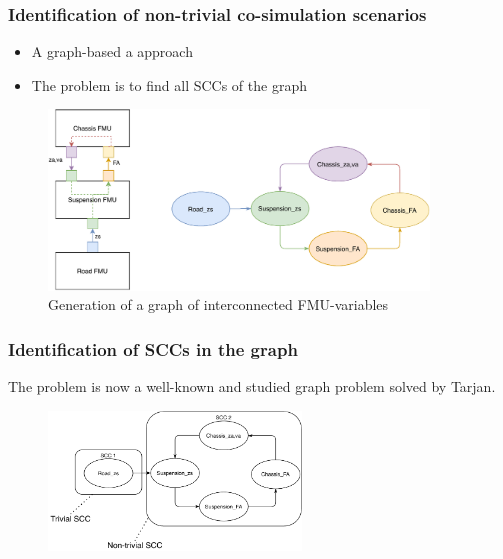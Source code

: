 \documentclass{beamer}
\begin{document}
\begin{frame}
\frametitle{Identification of non-trivial co-simulation scenarios}
\begin{itemize}
    \item A graph-based a approach 
    \item The problem is to find all SCCs of the graph
\end{itemize}
\begin{figure}
    \centering
    \includegraphics[width=0.9\textwidth]{images/quarter_car-graph.pdf}
    \caption{Generation of a graph of interconnected FMU-variables}
\end{figure}
\end{frame}

\begin{frame}
\frametitle{Identification of SCCs in the graph}
The problem is now a well-known and studied graph problem solved by Tarjan.
\begin{figure}
    \centering
    \includegraphics[width=0.6\textwidth]{images/quarter_car_SCC.pdf}
\end{figure}
\end{frame}
\end{document}
